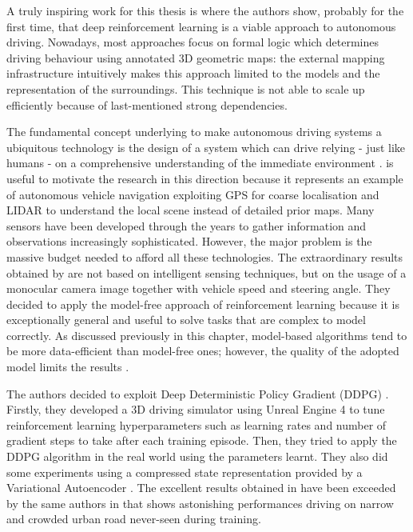 A truly inspiring work for this thesis is \cite{kendall2019learning} where the authors show, probably for the first time, that deep reinforcement learning is a viable approach to autonomous driving. Nowadays,  most approaches focus on formal logic which determines driving behaviour using annotated 3D geometric maps: the external mapping infrastructure intuitively makes this approach limited to the models and the representation of the surroundings.
This technique is not able to scale up efficiently because of last-mentioned strong dependencies.

The fundamental concept underlying \cite{kendall2019learning} to make autonomous driving systems a ubiquitous technology is the design of a system which can drive relying - just like humans - on a comprehensive understanding of the immediate environment \cite{badrinarayanan2017segnet}.
\cite{ort2018autonomous} is useful to motivate the research in this direction because it represents an example of autonomous vehicle navigation exploiting GPS for coarse localisation and LIDAR to understand the local scene instead of detailed prior maps.
Many sensors have been developed through the years to gather information and observations increasingly sophisticated. However, the major problem is the massive budget needed to afford all these technologies.
The extraordinary results obtained by \cite{kendall2019learning} are not based on intelligent sensing techniques, but on the usage of a monocular camera image together with vehicle speed and steering angle.
They decided to apply the model-free approach of reinforcement learning because it is exceptionally general and useful to solve tasks that are complex to model correctly. As discussed previously in this chapter, model-based algorithms tend to be more data-efficient than model-free ones; however, the quality of the adopted model limits the results \cite{deisenroth2011pilco}.

The authors decided to exploit Deep Deterministic Policy Gradient (DDPG) \cite{lillicrap2015continuous}.
Firstly, they developed a 3D driving simulator using Unreal Engine 4 to tune reinforcement learning hyperparameters such as learning rates and number of gradient steps to take after each training episode. Then, they tried to apply the DDPG algorithm in the real world using the parameters learnt. They also did some experiments using a compressed state representation provided by a Variational Autoencoder \cite{kingma2013auto,rezende2014stochastic}.
The excellent results obtained in \cite{kendall2019learning} have been exceeded by the same authors in \cite{wayve2019human} that shows astonishing performances driving on narrow and crowded urban road never-seen during training.

